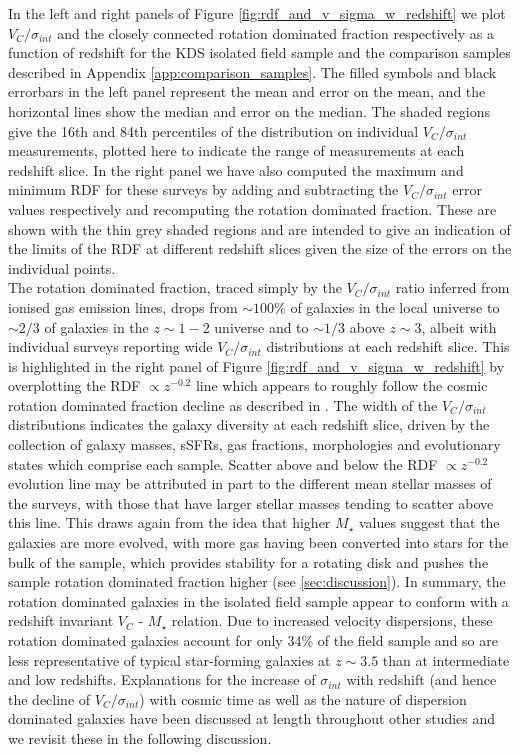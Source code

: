 \documentclass[fleqn,usenatbib]{mn2e}
\begin{document}
In the left and right panels of Figure \ref{fig:rdf_and_v_sigma_w_redshift} we plot $V_{C}/\sigma_{int}$ and the closely connected rotation dominated fraction respectively as a function of redshift for the KDS isolated field sample and the comparison samples described in Appendix \ref{app:comparison_samples}.
The filled symbols and black errorbars in the left panel represent the mean and error on the mean, and the horizontal lines show the median and error on the median.
The shaded regions give the 16th and 84th percentiles of the distribution on individual $V_{C}/\sigma_{int}$ measurements, plotted here to indicate the range of measurements at each redshift slice.
In the right panel we have also computed the maximum and minimum RDF for these surveys by adding and subtracting the $V_{C}/\sigma_{int}$ error values respectively and recomputing the rotation dominated fraction.
These are shown with the thin grey shaded regions and are intended to give an indication of the limits of the RDF at different redshift slices given the size of the errors on the individual points.\\

The rotation dominated fraction, traced simply by the $V_{C}/\sigma_{int}$ ratio inferred from ionised gas emission lines, drops from $\sim 100\%$ of galaxies in the local universe to $\sim 2/3$ of galaxies in the $z \sim 1-2$ universe and to $\sim 1/3$ above $z \sim 3$, albeit with individual surveys reporting wide $V_{C}/\sigma_{int}$ distributions at each redshift slice.
This is highlighted in the right panel of Figure \ref{fig:rdf_and_v_sigma_w_redshift} by overplotting the RDF $\propto z^{-0.2}$ line which appears to roughly follow the cosmic rotation dominated fraction decline as described in \cite{Stott2016}. 
The width of the $V_{C}/\sigma_{int}$ distributions indicates the galaxy diversity at each redshift slice, driven by the collection of galaxy masses, sSFRs, gas fractions, morphologies and evolutionary states which comprise each sample.
Scatter above and below the RDF $\propto z^{-0.2}$ evolution line may be attributed in part to the different mean stellar masses of the surveys, with those that have larger stellar masses tending to scatter above this line.
This draws again from the idea that higher $M_{\star}$ values suggest that the galaxies are more evolved, with more gas having been converted into stars for the bulk of the sample, which provides stability for a rotating disk and pushes the sample rotation dominated fraction higher (see \cref{sec:discussion}).
In summary, the rotation dominated galaxies in the isolated field sample appear to conform with a redshift invariant $V_{C}$ - $M_{\star}$ relation.
Due to increased velocity dispersions, these rotation dominated galaxies account for only $34\%$ of the field sample and so are less representative of typical star-forming galaxies at $z\sim3.5$ than at intermediate and low redshifts. 
Explanations for the increase of $\sigma_{int}$ with redshift (and hence the decline of $V_{C}/\sigma_{int}$) with cosmic time as well as the nature of dispersion dominated galaxies have been discussed at length throughout other studies \citep[e.g][]{ForsterSchreiber2009,Law2009,Burkert2010,Newman2013,Wisnioski2015} and we revisit these in the following discussion.
\end{document}
